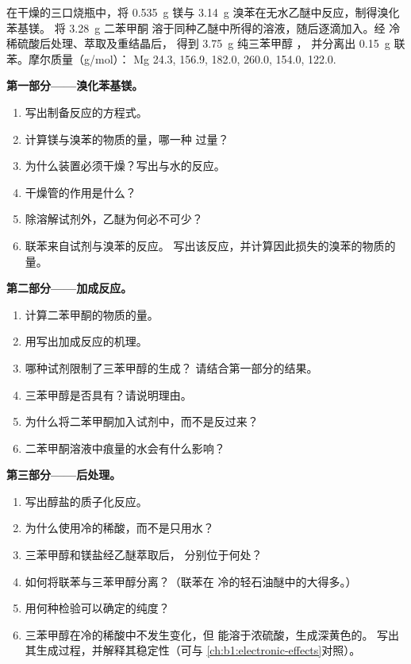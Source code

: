 \begin{problem}
\label{pb:b1:organomagnesium:1}
在干燥的三口烧瓶中，将 \qty{0.535}{g} 镁与
\qty{3.14}{g} 溴苯在无水乙醚中反应，制得溴化苯基镁。
将 \qty{3.28}{g} 二苯甲酮
 溶于同种乙醚中所得的溶液，随后逐滴加入。经
冷稀硫酸后处理、萃取及重结晶后，
得到 \qty{3.75}{g} 纯三苯甲醇 ，
并分离出 \qty{0.15}{g} 联苯。摩尔质量（\unit{g/mol}）：
Mg 24.3,  156.9,  182.0,  260.0,
 154.0,  122.0.

\medskip
\noindent\textbf{第一部分——溴化苯基镁。}
\begin{enumerate}
  \item 写出制备反应的方程式。
  \item 计算镁与溴苯的物质的量，哪一种
        过量？
  \item 为什么装置必须干燥？写出与水的反应。
  \item 干燥管的作用是什么？
  \item 除溶解试剂外，乙醚为何必不可少？
  \item 联苯来自试剂与溴苯的反应。
        写出该反应，并计算因此损失的溴苯的物质的量。
\end{enumerate}

\medskip
\noindent\textbf{第二部分——加成反应。}
\begin{enumerate}[resume]
  \item 计算二苯甲酮的物质的量。
  \item 用写出加成反应的机理。
  \item 哪种试剂限制了三苯甲醇的生成？
        请结合第一部分的结果。
  \item 三苯甲醇是否具有？请说明理由。
  \item 为什么将二苯甲酮加入试剂中，而不是反过来？
  \item 二苯甲酮溶液中痕量的水会有什么影响？
\end{enumerate}

\medskip
\noindent\textbf{第三部分——后处理。}
\begin{enumerate}[resume]
  \item 写出醇盐的质子化反应。
  \item 为什么使用冷的稀酸，而不是只用水？
  \item 三苯甲醇和镁盐经乙醚萃取后，
        分别位于何处？
  \item 如何将联苯与三苯甲醇分离？（联苯在
        冷的轻石油醚中的大得多。）
  \item 用何种检验可以确定的纯度？
  \item 三苯甲醇在冷的稀酸中不发生变化，但
        能溶于浓硫酸，生成深黄色的。
        写出其生成过程，并解释其稳定性（可与
        \cref{ch:b1:electronic-effects}对照）。
\end{enumerate}


\end{problem}
